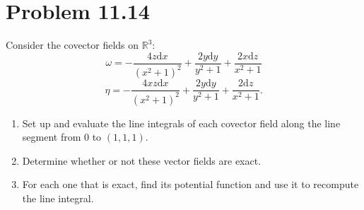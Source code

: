 \documentclass[11pt, letterpaper]{article}
\begin{document}
\section{Problem 11.14}
\begin{problem}
	Consider the covector fields on $\mathbb{R} ^3$:
	\[
		\omega =-\frac{4z \mathrm{d} x}{\left( x^2+1 \right) ^2} +\frac{2y\mathrm{d} y}{y^2+1} +\frac{2x\mathrm{d} z}{x^2+1} 
	\]
	\[
		\eta =-\frac{4xz\mathrm{d} x}{\left( x^2+1 \right) ^2} +\frac{2y\mathrm{d} y}{y^2+1} +\frac{2\mathrm{d} z}{x^2+1} 
	.\]
	\begin{enumerate}
		\item Set up and evaluate the line integrals of each covector field along the line segment from $0$ to $(1,1,1)$.
		\item Determine whether or not these vector fields are exact.
		\item For each one that is exact, find its potential function and use it to recompute the line integral.
	\end{enumerate}
\end{problem}
\end{document}
